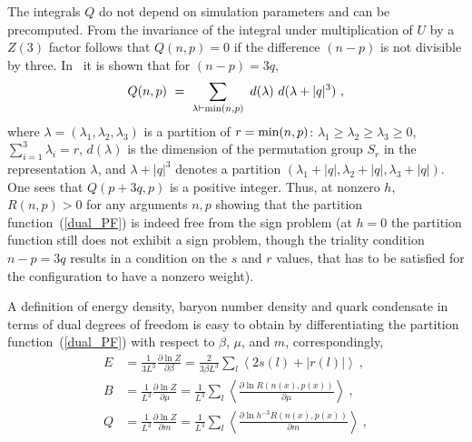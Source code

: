 \documentclass[a4paper,11pt]{article}
\begin{document}
The integrals $Q$ do not depend on simulation parameters and can be precomputed. From the invariance of the integral under multiplication of $U$ by a $Z(3)$ factor follows that $Q(n, p) = 0$ if the difference $(n - p)$ is not divisible by three. In~\cite{sun-integrals} it is shown that for $(n - p) = 3q$,
\begin{equation}
    Q(n,p) \ = \  
	\sum_{\lambda \vdash {\rm min}(n,p)} \ d(\lambda) \ d(\lambda + |q|^3) \ , 
	\label{QSUN}
\end{equation}
where $\lambda = (\lambda_1, \lambda_2, \lambda_3)$ is a partition of $r = {\rm min}(n,p)$:
$\lambda_1 \geq \lambda_2 \geq \lambda_3 \geq 0$, 
$\sum_{i=1}^3 \lambda_i = r$,
$d(\lambda)$ is the dimension of the permutation group $S_r$ in the representation $\lambda$, and $\lambda + |q|^3$ 
denotes a partition $(\lambda_1 + |q|, \lambda_2  + |q|, \lambda_3  + |q|)$. One sees that $Q(p + 3q, p)$ is a positive integer. Thus, at nonzero $h$, $R(n, p) > 0$ for 
any arguments $n, p$ showing that the partition function~(\ref{dual_PF}) is indeed free from the sign problem (at 
$h=0$ the partition function still does not exhibit a sign problem, though the triality condition $n - p = 3 q$ results 
in a condition on the $s$ and $r$ values, that has to be satisfied for the configuration to have a nonzero weight).

A definition of energy density, baryon number density and quark condensate in terms of dual degrees of freedom is easy to obtain by differentiating the partition function~(\ref{dual_PF}) with respect to $\beta$, $\mu$, and $m$, correspondingly,
\begin{align}
    E &= \frac{1}{3 L^3} \frac{\partial \ln Z}{\partial \beta} = 
    \frac{2}{3 \beta L^3} 
    \sum_l \left\langle 2 s(l) + |r(l)| \right\rangle \ , \\
    B &= \frac{1}{L^3} \frac{\partial \ln Z}{\partial \mu}
    =  \frac{1}{L^3}
     \sum_l \left\langle \frac{\partial \ln R(n(x), p(x))}{\partial \mu} \right\rangle \ , \\
     Q &= \frac{1}{L^3} \frac{\partial \ln Z}{\partial m}
    =  \frac{1}{L^3}
     \sum_l \left\langle \frac{\partial \ln h^{-3} R(n(x), p(x))}{\partial m} \right\rangle \ , \\
\end{align}
\end{document}
